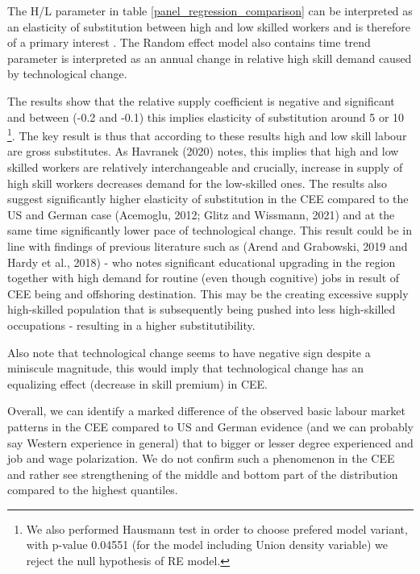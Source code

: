\documentclass{article}
\begin{document}
The H/L parameter in table \ref{panel_regression_comparison} can be interpreted as an elasticity of substitution between high and low skilled workers and is therefore of a primary interest . The Random effect model also contains time trend parameter is interpreted as an annual change in relative high skill demand caused by technological change.


The results show that the relative supply coefficient is negative and significant and between (-0.2 and -0.1) this implies elasticity of substitution around 5 or 10 \footnote{We also performed Hausmann test in order to choose prefered model variant, with p-value 0.04551 (for the model including Union density variable) we reject the null hypothesis of RE model.}. The key result is thus that according to these results high and low skill labour are gross substitutes. As Havranek (2020) notes, this implies that high and low skilled workers are relatively interchangeable and crucially, increase in supply of high skill workers decreases demand for the low-skilled ones. The results also suggest significantly higher elasticity of substitution in the CEE compared to the US and German case (Acemoglu, 2012; Glitz and Wissmann, 2021) and at the same time significantly lower pace of technological change. This result could be in line with findings of previous literature such as (Arend and Grabowski, 2019 and Hardy et al., 2018) - who notes significant educational upgrading in the region together with high demand for routine (even though cognitive) jobs in result of CEE being and offshoring destination. This may be the creating excessive supply high-skilled population that is subsequently being pushed into less high-skilled occupations - resulting in a higher substitutibility.

Also note that technological change seems to have negative sign despite a miniscule magnitude, this would imply that technological change has an equalizing effect (decrease in skill premium) in CEE.

Overall, we can identify a marked difference of the observed basic labour market patterns in the CEE compared to US and German evidence (and we can probably say Western experience in general) that to bigger or lesser degree experienced and job and wage polarization. We do not confirm such a phenomenon in the CEE and rather see strengthening of the middle and bottom part of the distribution compared to the highest quantiles.
\end{document}
